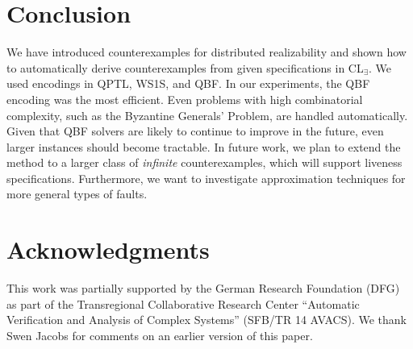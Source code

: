 \documentclass{LMCS}
\theoremstyle{plain}\newtheorem{theorem}[thm]{Theorem}
\theoremstyle{plain}\newtheorem{lemma}[thm]{Lemma}
\theoremstyle{plain}\newtheorem{proposition}[thm]{Proposition}
\theoremstyle{plain}\newtheorem{corollary}[thm]{Corollary}
\theoremstyle{definition}\newtheorem{definition}{Definition}[section]
\begin{document}
\section{Conclusion}


We have introduced counterexamples for distributed realizability and shown how to automatically derive counterexamples from given specifications in CL$_\exists$.
We used encodings in QPTL, WS1S, and QBF\@.
In our experiments, the QBF encoding was the most efficient.
Even problems with high combinatorial complexity, such as the Byzantine Generals' Problem, are handled automatically.
Given that QBF solvers are likely to continue to improve in the future, even larger instances should become tractable.
In future work, we plan to extend the method to a larger class of \emph{infinite} counterexamples, which will support liveness specifications.
Furthermore, we want to investigate approximation techniques for more general types of faults.

\section*{Acknowledgments}


This work was partially supported by the German Research Foundation (DFG) as part of the Transregional Collaborative Research Center ``Automatic Verification and Analysis of Complex Systems'' (SFB/TR 14 AVACS).
We thank Swen Jacobs for comments on an earlier version of this paper.



\end{document}
